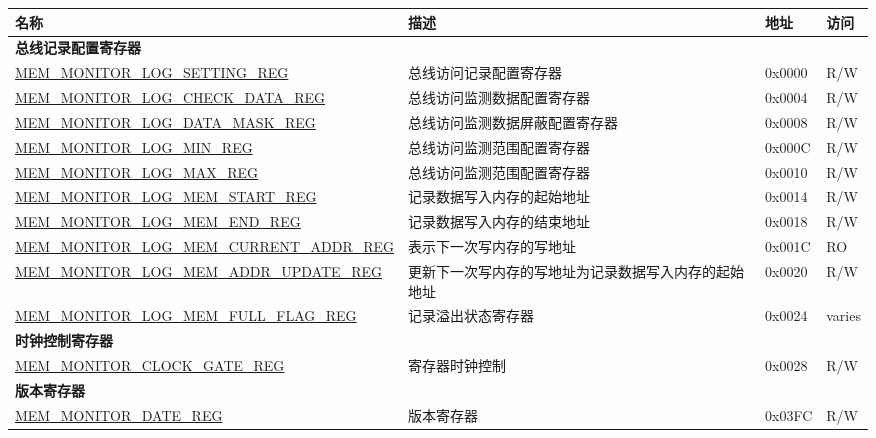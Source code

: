 \begin{longtable}{ | l| m{5cm} | l | l | }
\hline\rowcolor{lightgray}
{\bfseries 名称} & {\bfseries 描述} &  {\bfseries 地址} & {\bfseries 访问} \\ \hline
\endhead
\multicolumn{4}{|l|}{\textbf{总线记录配置寄存器}} \\ \hline
\hyperref[regdesc:MEMMONITORLOGSETTINGREG]{MEM\_MONITOR\_LOG\_SETTING\_REG} & 总线访问记录配置寄存器 & 0x0000 & R/W \\ \hline
\hyperref[regdesc:MEMMONITORLOGCHECKDATAREG]{MEM\_MONITOR\_LOG\_CHECK\_DATA\_REG} & 总线访问监测数据配置寄存器 & 0x0004 & R/W \\ \hline
\hyperref[regdesc:MEMMONITORLOGDATAMASKREG]{MEM\_MONITOR\_LOG\_DATA\_MASK\_REG} & 总线访问监测数据屏蔽配置寄存器 & 0x0008 & R/W \\ \hline
\hyperref[regdesc:MEMMONITORLOGMINREG]{MEM\_MONITOR\_LOG\_MIN\_REG} & 总线访问监测范围配置寄存器 & 0x000C & R/W \\ \hline
\hyperref[regdesc:MEMMONITORLOGMAXREG]{MEM\_MONITOR\_LOG\_MAX\_REG} & 总线访问监测范围配置寄存器 & 0x0010 & R/W \\ \hline
\hyperref[regdesc:MEMMONITORLOGMEMSTARTREG]{MEM\_MONITOR\_LOG\_MEM\_START\_REG} & 记录数据写入内存的起始地址 & 0x0014 & R/W \\ \hline
\hyperref[regdesc:MEMMONITORLOGMEMENDREG]{MEM\_MONITOR\_LOG\_MEM\_END\_REG} & 记录数据写入内存的结束地址 & 0x0018 & R/W \\ \hline
\hyperref[regdesc:MEMMONITORLOGMEMCURRENTADDRREG]{MEM\_MONITOR\_LOG\_MEM\_CURRENT\_ADDR\_REG} & 表示下一次写内存的写地址 & 0x001C & RO \\ \hline
\hyperref[regdesc:MEMMONITORLOGMEMADDRUPDATEREG]{MEM\_MONITOR\_LOG\_MEM\_ADDR\_UPDATE\_REG} & 更新下一次写内存的写地址为记录数据写入内存的起始地址 & 0x0020 & R/W \\ \hline
\hyperref[regdesc:MEMMONITORLOGMEMFULLFLAGREG]{MEM\_MONITOR\_LOG\_MEM\_FULL\_FLAG\_REG} & 记录溢出状态寄存器 & 0x0024 & varies \\ \hline
\multicolumn{4}{|l|}{\textbf{时钟控制寄存器}} \\ \hline
\hyperref[regdesc:MEMMONITORCLOCKGATEREG]{MEM\_MONITOR\_CLOCK\_GATE\_REG} & 寄存器时钟控制 & 0x0028 & R/W \\ \hline
\multicolumn{4}{|l|}{\textbf{版本寄存器}} \\ \hline
\hyperref[regdesc:MEMMONITORDATEREG]{MEM\_MONITOR\_DATE\_REG} & 版本寄存器 & 0x03FC & R/W \\ \hline
\end{longtable}
